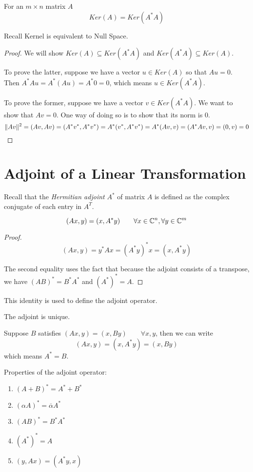 \begin{theorem}
For an $m \times n$ matrix $A$ 
$$Ker(A) = Ker(A^{*}A)$$

Recall Kernel is equivalent to Null Space.
\end{theorem}

\begin{proof}
We will show $Ker(A) \subseteq Ker(A^{*} A)$ and $Ker(A^{*} A) \subseteq Ker(A)$. 

To prove the latter, suppose we have a vector $u \in Ker(A)$ so that $Au = 0$. Then $A^{*} A u = A^{*} (Au) = A^{*} 0 = 0$, which means $u \in Ker(A^{*} A)$. 

To prove the former, suppose we have a vector $v \in Ker(A^{*} A)$. We want to show that $Av = 0$. One way of doing so is to show that its norm is 0. 
$$\lVert Av\rVert^{2} = (Av, Av) = (A^{*} v^{*}, A^{*} v^{*}) = A^{*} (v^{*}, A^{*} v^{*}) = A^{*} (Av, v) = (A^{*} Av, v) = (0, v) = 0$$
\end{proof}

\section{Adjoint of a Linear Transformation} 
Recall that the \textit{Hermitian adjoint} $A^{*}$ of matrix $A$ is defined as the complex conjugate of each entry in $A^{T}$. 

\begin{theorem}
$$(Ax, y) = (x, A^{*}y) \qquad \forall x \in \mathbb{C}^{n}, \forall y \in \mathbb{C}^{m}$$
\end{theorem}

\begin{proof}
$$(Ax, y) = y^{*} Ax = (A^{*} y)^{*} x = (x, A^{*} y)$$

The second equality uses the fact that because the adjoint consists of a transpose, we have $(AB)^{*} = B^{*} A^{*}$ and $(A^{*})^{*} = A$.  
\end{proof}

This identity is used to define the adjoint operator. 

\begin{lemma}
The adjoint is unique. 
\end{lemma}

\begin{lproof}
Suppose $B$ satisfies $(Ax, y) = (x, By) \qquad \forall x, y$, then we can write 
$$(Ax, y) = (x, A^{*} y) = (x, By)$$
which means $A^{*} = B$.
\end{lproof}

Properties of the adjoint operator:
\begin{enumerate}
	\item $(A + B)^{*} = A^{*} + B^{*}$ 
	\item $(\alpha A)^{*} = \overline{\alpha} A^{*}$ 
	\item $(AB)^{*} = B^{*} A^{*}$ 
	\item $(A^{*})^{*} = A$
	\item $(y, Ax) = (A^{*}y, x)$ 
\end{enumerate}

